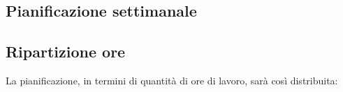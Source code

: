 
\subsection{Pianificazione settimanale}
\prospettoSettimanale

\newpage

\subsection{Ripartizione ore}

La pianificazione, in termini di quantità di ore di lavoro, sarà così distribuita:

\begin{center}
    
\end{center}
